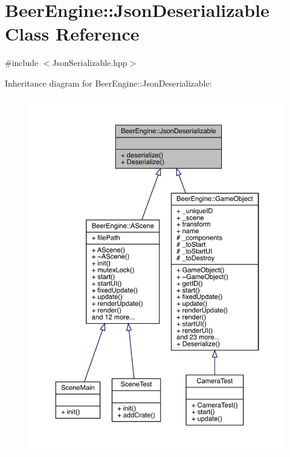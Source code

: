 \hypertarget{class_beer_engine_1_1_json_deserializable}{}\section{Beer\+Engine\+:\+:Json\+Deserializable Class Reference}
\label{class_beer_engine_1_1_json_deserializable}


{\ttfamily \#include $<$Json\+Serializable.\+hpp$>$}



Inheritance diagram for Beer\+Engine\+:\+:Json\+Deserializable\+:\nopagebreak
\begin{figure}[H]
\begin{center}
\leavevmode
\includegraphics[width=350pt]{class_beer_engine_1_1_json_deserializable__inherit__graph}
\end{center}
\end{figure}


